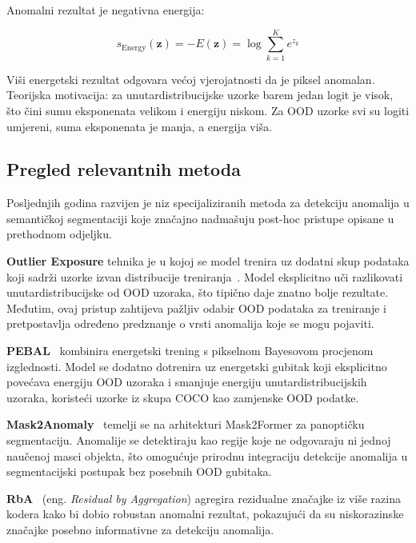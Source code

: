 \documentclass[diplomskirad]{fer}
\begin{document}
Anomalni rezultat je negativna energija:

\begin{equation}
	s_{\text{Energy}}(\mathbf{z}) = -E(\mathbf{z}) = \log \sum_{k=1}^{K} e^{z_k}
\end{equation}

Viši energetski rezultat odgovara većoj vjerojatnosti da je piksel anomalan. Teorijska motivacija: za unutardistribucijske uzorke barem jedan logit je visok, što čini sumu eksponenata velikom i energiju niskom. Za OOD uzorke svi su logiti umjereni, suma eksponenata je manja, a energija viša.

\subsection{Pregled relevantnih metoda}

Posljednjih godina razvijen je niz specijaliziranih metoda za detekciju anomalija u semantičkoj segmentaciji koje značajno nadmašuju post-hoc pristupe opisane u prethodnom odjeljku.

\textbf{Outlier Exposure} tehnika je u kojoj se model trenira uz dodatni skup podataka koji sadrži uzorke izvan distribucije treniranja~\cite{chan2021segmentmeifyoucanbenchmarkanomalysegmentation}. Model eksplicitno uči razlikovati unutardistribucijske od OOD uzoraka, što tipično daje znatno bolje rezultate. Međutim, ovaj pristup zahtijeva pažljiv odabir OOD podataka za treniranje i pretpostavlja određeno predznanje o vrsti anomalija koje se mogu pojaviti.

\textbf{PEBAL}~\cite{tian2022pebal} kombinira energetski trening s pikselnom Bayesovom procjenom izglednosti. Model se dodatno dotrenira uz energetski gubitak koji eksplicitno povećava energiju OOD uzoraka i smanjuje energiju unutardistribucijskih uzoraka, koristeći uzorke iz skupa COCO kao zamjenske OOD podatke.

\textbf{Mask2Anomaly}~\cite{rai2023mask2anomaly} temelji se na arhitekturi Mask2Former za panoptičku segmentaciju. Anomalije se detektiraju kao regije koje ne odgovaraju ni jednoj naučenoj masci objekta, što omogućuje prirodnu integraciju detekcije anomalija u segmentacijski postupak bez posebnih OOD gubitaka.

\textbf{RbA}~\cite{nayal2023rba} (eng. \textit{Residual by Aggregation}) agregira rezidualne značajke iz više razina kodera kako bi dobio robustan anomalni rezultat, pokazujući da su niskorazinske značajke posebno informativne za detekciju anomalija.
\end{document}
